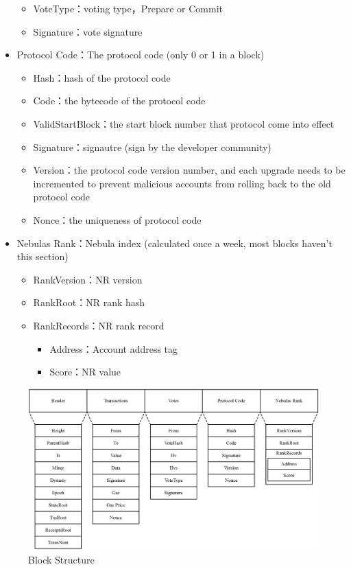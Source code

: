 \begin{itemize}
\begin{itemize}
		\item VoteType：voting type，Prepare or Commit
		\item Signature：vote signature
		\end{itemize}
	\item Protocol Code：The protocol code (only 0 or 1 in a block)
		\begin{itemize}
		\item Hash：hash of the protocol code
		\item Code：the bytecode of the protocol code
		\item ValidStartBlock：the start block number that protocol come into effect
		\item Signature：signautre (sign by the developer community)
		\item Version：the protocol code version number, and each upgrade needs to be incremented to prevent malicious accounts from rolling back to the old protocol code
		\item Nonce：the uniqueness of protocol code
		\end{itemize}
	\item Nebulas Rank：Nebula index (calculated once a week, most blocks haven't this section)
		\begin{itemize}
		\item RankVersion：NR version
		\item RankRoot：NR rank hash
		\item RankRecords：NR rank record
			\begin{itemize}
				\item Address：Account address tag
				\item Score：NR value
			\end{itemize}
		\end{itemize}
\end{itemize}

\begin{figure}[!h]
\centering
\includegraphics[width=13.8cm]{./figs/block}
\caption{Block Structure}
\label{fig:block}
\end{figure}

